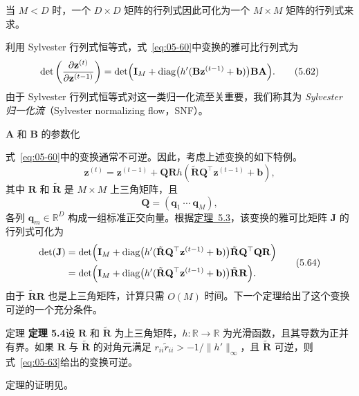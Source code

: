 当 $M<D$ 时，一个 $D\times D$ 矩阵的行列式因此可化为一个 $M\times M$ 矩阵的行列式来求。

利用 Sylvester 行列式恒等式，式~\eqref{eq:05-60}中变换的雅可比行列式为
\begin{equation}
\det\left(\frac{\partial\mathbf{z}^{(t)}}{\partial\mathbf{z}^{(t-1)}}\right)
 =\det\Bigl(\mathbf{I}_M+\operatorname{diag}\bigl(h'(\mathbf{B}\mathbf{z}^{(t-1)}+\mathbf{b})\bigr)
             \mathbf{B}\mathbf{A}\Bigr).
\tag{5.62}\label{eq:05-62}
\end{equation}
由于 Sylvester 行列式恒等式对这一类归一化流至关重要，我们称其为 \emph{Sylvester 归一化流}（Sylvester normalizing flow，SNF）。

\medskip\noindent $\mathbf{A}$ 和 $\mathbf{B}$ 的参数化\par\smallskip
式~\eqref{eq:05-60}中的变换通常不可逆。因此，考虑上述变换的如下特例。
\begin{equation}
\mathbf{z}^{(t)}=\mathbf{z}^{(t-1)}+\mathbf{Q}\mathbf{R}
       h(\tilde{\mathbf{R}}\mathbf{Q}^\top\mathbf{z}^{(t-1)}+\mathbf{b}),
\tag{5.63}\label{eq:05-63}
\end{equation}
其中 $\mathbf{R}$ 和 $\tilde{\mathbf{R}}$ 是 $M\times M$ 上三角矩阵，且
\[
\mathbf{Q}=(\mathbf{q}_1\ \cdots\ \mathbf{q}_M),
\]
各列 $\mathbf{q}_m\in\mathbb{R}^D$ 构成一组标准正交向量。根据\hyperlink{thm:05-03}{定理~5.3}，该变换的雅可比矩阵 $\mathbf{J}$ 的行列式可化为
\begin{equation}
\begin{aligned}
\det(\mathbf{J})
 &=\det\Bigl(\mathbf{I}_M+\operatorname{diag}\bigl(
    h'(\tilde{\mathbf{R}}\mathbf{Q}^\top\mathbf{z}^{(t-1)}+\mathbf{b})\bigr)
    \tilde{\mathbf{R}}\mathbf{Q}^\top\mathbf{Q}\mathbf{R}\Bigr)\\
 &=\det\Bigl(\mathbf{I}_M+\operatorname{diag}\bigl(
    h'(\tilde{\mathbf{R}}\mathbf{Q}^\top\mathbf{z}^{(t-1)}+\mathbf{b})\bigr)
    \tilde{\mathbf{R}}\mathbf{R}\Bigr).
\end{aligned}
\tag{5.64}\label{eq:05-64}
\end{equation}
由于 $\tilde{\mathbf{R}}\mathbf{R}$ 也是上三角矩阵，计算只需 $O(M)$ 时间。下一个定理给出了这个变换可逆的一个充分条件。

\begin{booknote}{定理 }
\textbf{\hypertarget{thm:05-04}{定理 5.4}}\quad 设 $\mathbf{R}$ 和 $\tilde{\mathbf{R}}$ 为上三角矩阵，$h\colon\mathbb{R}\to\mathbb{R}$ 为光滑函数，且其导数为正并有界。如果 $\mathbf{R}$ 与 $\tilde{\mathbf{R}}$ 的对角元满足 $r_{ii}\tilde r_{ii}>-1/\|h'\|_\infty$，且 $\tilde{\mathbf{R}}$ 可逆，则式~\eqref{eq:05-63}给出的变换可逆。
\end{booknote}
定理的证明见。

